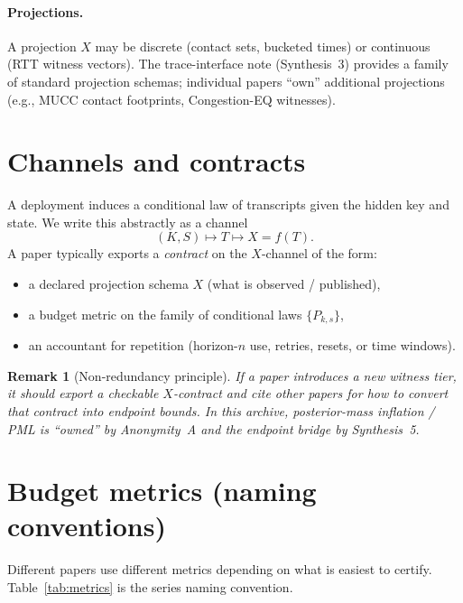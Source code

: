 \documentclass[11pt]{article}
\newtheorem{remark}{Remark}
\begin{document}
\paragraph{Projections.}
A projection $X$ may be discrete (contact sets, bucketed times) or continuous (RTT witness vectors).
The trace-interface note (Synthesis~3) provides a family of standard projection schemas; individual papers ``own'' additional projections (e.g., MUCC contact footprints, Congestion-EQ witnesses).\cite{series:traceifaces,series:state2,series:congeq}

\section{Channels and contracts}
A deployment induces a conditional law of transcripts given the hidden key and state.
We write this abstractly as a channel
\[
(K,S) \mapsto T \mapsto X=f(T).
\]
A paper typically exports a \emph{contract} on the $X$-channel of the form:
\begin{itemize}[leftmargin=1.2em]
\item a declared projection schema $X$ (what is observed / published),
\item a budget metric on the family of conditional laws $\{P_{k,s}\}$,
\item an accountant for repetition (horizon-$n$ use, retries, resets, or time windows).
\end{itemize}

\begin{remark}[Non-redundancy principle]
If a paper introduces a new witness tier, it should export a checkable $X$-contract and cite other papers for how to convert that contract into endpoint bounds.
In this archive, posterior-mass inflation / PML is ``owned'' by Anonymity~A and the endpoint bridge by Synthesis~5.\cite{series:oddsinflation,series:endpointbridge}
\end{remark}

\section{Budget metrics (naming conventions)}
Different papers use different metrics depending on what is easiest to certify.
Table~\ref{tab:metrics} is the series naming convention.
\end{document}
